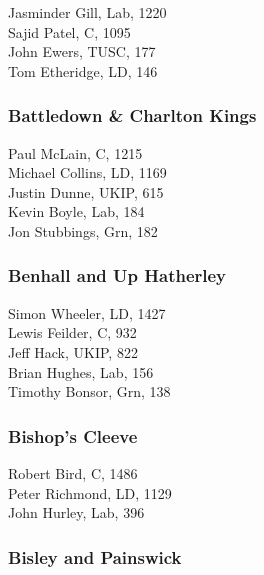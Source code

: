 \documentclass[a4paper,openany,10pt]{book}
\begin{document}


Jasminder Gill, Lab, 1220\\
Sajid Patel, C, 1095\\
John Ewers, TUSC, 177\\
Tom Etheridge, LD, 146\\


\subsubsection*{Battledown \& Charlton Kings}



Paul McLain, C, 1215\\
Michael Collins, LD, 1169\\
Justin Dunne, UKIP, 615\\
Kevin Boyle, Lab, 184\\
Jon Stubbings, Grn, 182\\


\subsubsection*{Benhall and Up Hatherley}



Simon Wheeler, LD, 1427\\
Lewis Feilder, C, 932\\
Jeff Hack, UKIP, 822\\
Brian Hughes, Lab, 156\\
Timothy Bonsor, Grn, 138\\


\subsubsection*{Bishop's Cleeve}



Robert Bird, C, 1486\\
Peter Richmond, LD, 1129\\
John Hurley, Lab, 396\\


\subsubsection*{Bisley and Painswick}
\end{document}

